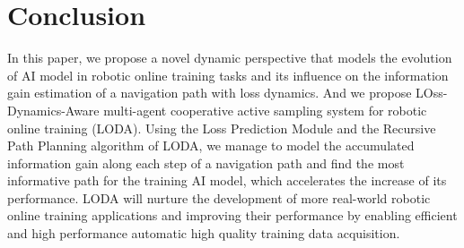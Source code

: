 \section{Conclusion}
In this paper, we propose a novel dynamic perspective that models the evolution of AI model in robotic online training tasks and its influence on the information gain estimation of a navigation path with loss dynamics.
And we propose LOss-Dynamics-Aware multi-agent cooperative active sampling system for robotic online training (LODA).
Using the Loss Prediction Module and the Recursive Path Planning algorithm of LODA, we manage to model the accumulated information gain along each step of a navigation path and find the most informative path for the training AI model, which accelerates the increase of its performance.
LODA will nurture the development of more real-world robotic online training applications and improving their performance by enabling efficient and high performance automatic high quality training data acquisition.